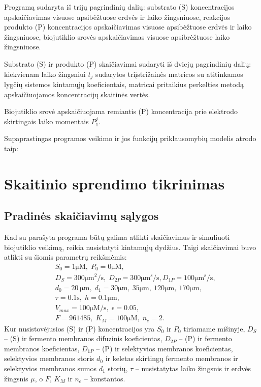 \documentclass[12pt, a4paper, lithuanian]{article}
\begin{document}
Programą sudaryta iš trijų pagrindinių dalių: substrato (S) koncentracijos
apskaičiavimas visuose apsibėžtuose erdvės ir laiko žingsniuose, reakcijos
produkto (P) koncentracijos
apskaičiavimas visuose apsibėžtuose erdvės ir laiko žingsniuose, biojutiklio
srovės apskaičiavimas visuose apsibrėžtuose laiko žingsniuose.

Substrato (S) ir produkto (P) skaičiavimai sudaryti iš dviejų pagrindinių
dalių: kiekvienam laiko žingsniui $t_j$  sudarytos triįstrižainės matricos su
atitinkamos lygčių sistemos kintamųjų koeficientais, matricai pritaikius
perkelties metodą apskaičiuojamos koncentracijų skaitinės vertės.

Biojutiklio srovė apskaičiuojama remiantis (P) koncentracija prie elektrodo
skirtingais laiko momentais $P^j_1$.

Supaprastingas programos veikimo ir jos funkcijų priklausomybių modelis atrodo
taip:



\section{Skaitinio sprendimo tikrinimas}
\subsection{Pradinės skaičiavimų sąlygos}

Kad su parašyta programa būtų galima atlikti skaičiavimus ir simuliuoti
biojutiklio veikimą, reikia nusistatyti kintamųjų dydžius. Taigi skaičiavimai
buvo atlikti su šiomis parametrų reikšmėmis:
 \begin{equation}
 \begin{aligned}
     &S_0 = 1 \mathrm{\mu M},\; P_0 = 0 \mathrm{\mu M},\\
     &D_S = 300 \mathrm{\mu m^2/s},\; D_{2P} = 300 \mathrm{\mu m^s/s}, D_{1P} = 100 \mathrm{\mu m^s/s},\\\
     &d_0 = 20\ \mathrm{\mu m},\; d_1 = 30 \mathrm{\mu
 m},\ 35 \mathrm{\mu m},\ 120 \mathrm{\mu m},\ 170\mathrm{\mu m},\;\\
     &\tau = 0.1\mathrm{s},\; h=0.1 \mathrm{\mu m},\\
     &V_{max} = 100\mathrm{\mu M /s},\; \epsilon = 0.05,\\
     &F=961485,\; K_M= 100\mathrm{\mu M},\; n_e = 2.
 \end{aligned}
 \end{equation}
Kur nusistovėjusios (S) ir (P) koncentracijos yra $S_0$ ir $P_0$ tiriamame
mišinyje, $D_S$ – (S) ir fermento membranos difuzinis koeficientas, 
$D_{2P}$ – (P) ir fermento membranos koeficientas, $D_{1P}$ –
     (P) ir selektyvios membranos koeficientas,
     selektyvios membranos storis $d_0$ ir keletas skirtingų fermento membranos
     ir selektyvios membranos sumos
     $d_1$ storių,
     $\tau$ – nusistatytas laiko žingsnis ir erdvės žingsnis $\mu$, o $F$, $K_M$
     ir $n_e$ – konstantos.
\end{document}
